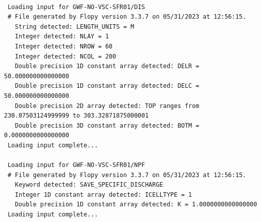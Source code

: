 \small
\begin{lstlisting}[style=modeloutput]

 Loading input for GWF-NO-VSC-SFR01/DIS
 # File generated by Flopy version 3.3.7 on 05/31/2023 at 12:56:15.
   String detected: LENGTH_UNITS = M
   Integer detected: NLAY = 1
   Integer detected: NROW = 60
   Integer detected: NCOL = 200
   Double precision 1D constant array detected: DELR = 50.000000000000000
   Double precision 1D constant array detected: DELC = 50.000000000000000
   Double precision 2D array detected: TOP ranges from 230.07503124999999 to 303.32871875000001
   Double precision 3D constant array detected: BOTM = 0.0000000000000000
 Loading input complete...

 Loading input for GWF-NO-VSC-SFR01/NPF
 # File generated by Flopy version 3.3.7 on 05/31/2023 at 12:56:15.
   Keyword detected: SAVE_SPECIFIC_DISCHARGE
   Integer 1D constant array detected: ICELLTYPE = 1
   Double precision 1D constant array detected: K = 1.0000000000000000
 Loading input complete...
\end{lstlisting}
